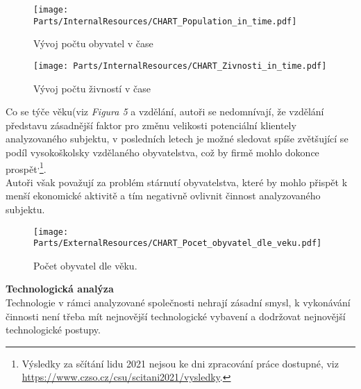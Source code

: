 \begin{figure}[!hbtp]
	\centering
	\texttt{[image: Parts/InternalResources/CHART\_Population\_in\_time.pdf]}
	\caption[Vývoj počtu obyvatel v čase]{Vývoj počtu obyvatel v čase}
	\label{fig:Vyvoj poctu obyvatel v case}
\end{figure}

\newpage

\begin{figure}[!hbtp]
	\centering
	\texttt{[image: Parts/InternalResources/CHART\_Zivnosti\_in\_time.pdf]}
	\caption[Vývoj počtu živností v čase]{Vývoj počtu živností v čase}
	\label{fig:Vyvoj poctu zivnosti v case}
\end{figure}

Co se týče věku(viz \textit{Figura 5} a vzdělání, autoři se nedomnívají, že vzdělání představu zásadnější faktor pro změnu velikosti potenciální klientely analyzovaného subjektu, v posledních letech je možné sledovat spíše zvětšující se podíl vysokoškolsky vzdělaného obyvatelstva, což by firmě mohlo dokonce prospět\textsuperscript{,}\footnote{Výsledky za sčítání lidu 2021 nejsou ke dni zpracování práce dostupné, viz \url{https://www.czso.cz/csu/scitani2021/vysledky}.}.\\

Autoři však považují za problém stárnutí obyvatelstva, které by mohlo přispět k menší ekonomické aktivitě a tím negativně ovlivnit činnost analyzovaného subjektu.\\

\newpage

\begin{figure}[!hbtp]
	\centering
	\texttt{[image: Parts/ExternalResources/CHART\_Pocet\_obyvatel\_dle\_veku.pdf]}
	\caption[Počet obyvatel dle věku]{Počet obyvatel dle věku.}
	\label{fig:Pocet obyvatel dle veku}
\end{figure}




\newpage

\textbf{Technologická analýza}\\

Technologie v rámci analyzované společnosti nehrají zásadní smysl, k vykonávání činnosti není třeba mít nejnovější technologické vybavení a dodržovat nejnovější technologické postupy.\\

